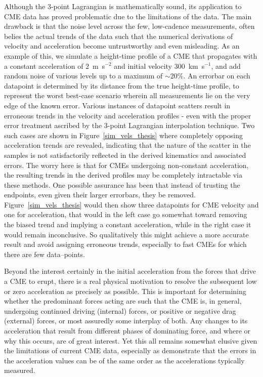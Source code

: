 \documentclass[structabstract]{aa}
\begin{document}
Although the 3-point Lagrangian is mathematically sound, its application to CME data has proved problematic due to the limitations of the data. The main drawback is that the noise level across the few, low-cadence measurements, often belies the actual trends of the data such that the numerical derivations of velocity and acceleration become untrustworthy and even misleading. As an example of this, we simulate a height-time profile of a CME that propagates with a constant acceleration of 2~m~s$^{-2}$ and initial velocity 300~km~s$^{-1}$, and add random noise of various levels up to a maximum of $\sim$20\%. An errorbar on each datapoint is determined by its distance from the true height-time profile, to represent the worst best-case scenario wherein all measurements lie on the very edge of the known error. Various instances of datapoint scatters result in erroneous trends in the velocity and acceleration profiles - even with the proper error treatment ascribed by the 3-point Lagrangian interpolation technique. Two such cases are shown in Figure~\ref{sim_vels_thesis} where completely opposing acceleration trends are revealed, indicating that the nature of the scatter in the samples is not satisfactorily reflected in the derived kinematics and associated errors. The worry here is that for CMEs undergoing non-constant acceleration, the resulting trends in the derived profiles may be completely intractable via these methods. One possible assurance has been that instead of trusting the endpoints, even given their larger errorbars, they be removed. Figure~\ref{sim_vels_thesis} would then show three datapoints for CME velocity and one for acceleration, that would in the left case go somewhat toward removing the biased trend and implying a constant acceleration, while in the right case it would remain inconclusive. So qualitatively this might achieve a more accurate result and avoid assigning erroneous trends, especially to fast CMEs for which there are few data--points.

Beyond the interest certainly in the initial acceleration from the forces that drive a CME to erupt, there is a real physical motivation to resolve the subsequent low or zero acceleration as precisely as possible. This is important for determining whether the predominant forces acting are such that the CME is, in general, undergoing continued driving (internal) forces, or positive or negative drag (external) forces, or most assuredly some interplay of both. Any changes to its acceleration that result from different phases of dominating force, and where or why this occurs, are of great interest. Yet this all remains somewhat elusive given the limitations of current CME data, especially as \citet{2007ApJ...657.1117W} demonstrate that the errors in the acceleration values can be of the same order as the accelerations typically measured. 
\end{document}
